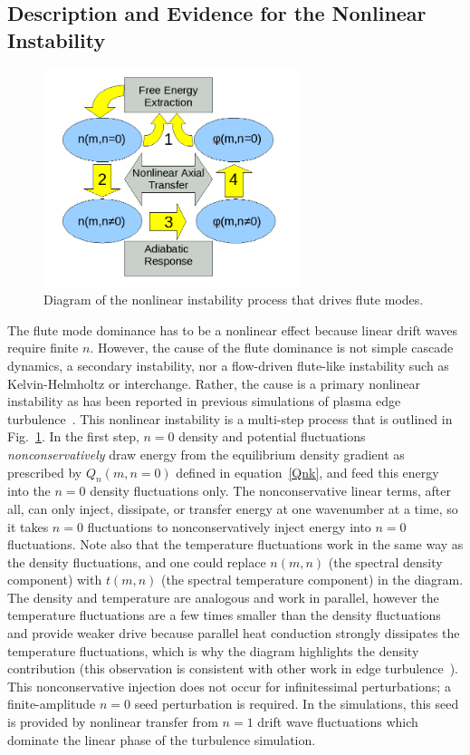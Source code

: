 \documentclass[showpacs,preprintnumbers,amsmath,amssymb,superscriptaddress]{revtex4}
\begin{document}
\subsection{Description and Evidence for the Nonlinear Instability}

\begin{figure}
\includegraphics[width=3in,height=2.5in]{nl_instability_diagram}
\hfil
\caption{Diagram of the nonlinear instability process that drives flute modes.}
\label{nl_instability_diagram}
\end{figure}

The flute mode dominance has to be a nonlinear effect because linear drift waves require finite $n$. However, the cause of the flute dominance is not simple cascade dynamics, a secondary 
instability, nor a flow-driven flute-like instability such as
Kelvin-Helmholtz or interchange. Rather, the cause is a primary
nonlinear instability as has been reported in previous simulations of
plasma edge turbulence~\cite{biskamp1995,drake1995}. 
This nonlinear instability is a multi-step process that is outlined in Fig.~\ref{nl_instability_diagram}.
In the first step, $n=0$ density and potential fluctuations \emph{nonconservatively} draw energy from the equilibrium density gradient as prescribed 
by $Q_n(m,n=0)$ defined in equation~\ref{Qnk}, and feed
this energy into the $n=0$ density fluctuations only. The nonconservative linear terms, after all, can only inject, dissipate, or transfer energy at one wavenumber at a time, so it takes
$n=0$ fluctuations to nonconservatively inject energy into $n=0$
fluctuations. Note also that the temperature fluctuations work in the same way as the density fluctuations, and one could replace $n(m,n)$ (the spectral density component)
with $t(m,n)$ (the spectral temperature component) in the diagram. The density and temperature are analogous and work in parallel, however the temperature fluctuations are a few times smaller
than the density fluctuations and provide weaker drive because
parallel heat conduction strongly dissipates the temperature
fluctuations, which is why the diagram highlights the density
contribution (this observation is consistent with other work in edge turbulence~\cite{zeiler1997}).
 This nonconservative injection does not occur for
infinitessimal perturbations; a finite-amplitude $n=0$ seed
perturbation is required.  In the simulations, this seed is provided
by nonlinear transfer from $n=1$ drift wave fluctuations which
dominate the linear phase of the turbulence simulation.
\end{document}
